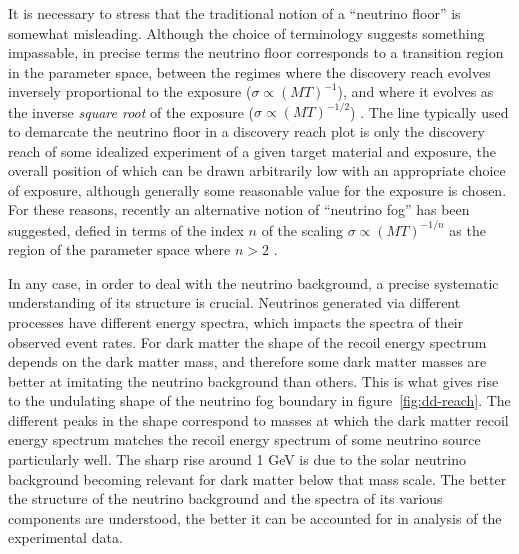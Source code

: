 \documentclass[b5paper, 10pt, twoside]{book}
\begin{document}
It is necessary to stress that the traditional notion of a ``neutrino floor'' is somewhat misleading. Although the choice of terminology suggests something impassable, in precise terms the neutrino floor corresponds to a transition region in the parameter space, between the regimes where the discovery reach evolves inversely proportional to the exposure ($\sigma\propto (MT)^{-1}$), and where it evolves as the inverse \emph{square root} of the exposure ($\sigma\propto (MT)^{-1/2}$) \parencite{BillardFigueroaFelicianoStrigari2014}. The line typically used to demarcate the neutrino floor in a discovery reach plot is only the discovery reach of some idealized experiment of a given target material and exposure, the overall position of which can be drawn arbitrarily low with an appropriate choice of exposure, although generally some reasonable value for the exposure is chosen. For these reasons, recently an alternative notion of ``neutrino fog'' has been suggested, defied in terms of the index $n$ of the scaling $\sigma\propto (MT)^{-1/n}$ as the region of the parameter space where $n>2$ \parencites{OHare2021, CarewEtAl2024}.

In any case, in order to deal with the neutrino background, a precise systematic understanding of its structure is crucial. Neutrinos generated via different processes have different energy spectra, which impacts the spectra of their observed event rates. For dark matter the shape of the recoil energy spectrum depends on the dark matter mass, and therefore some dark matter masses are better at imitating the neutrino background than others. This is what gives rise to the undulating shape of the neutrino fog boundary in figure~\ref{fig:dd-reach}. The different peaks in the shape correspond to masses at which the dark matter recoil energy spectrum matches the recoil energy spectrum of some neutrino source particularly well. The sharp rise around 1 GeV is due to the solar neutrino background becoming relevant for dark matter below that mass scale. The better the structure of the neutrino background and the spectra of its various components are understood, the better it can be accounted for in analysis of the experimental data.
\end{document}
